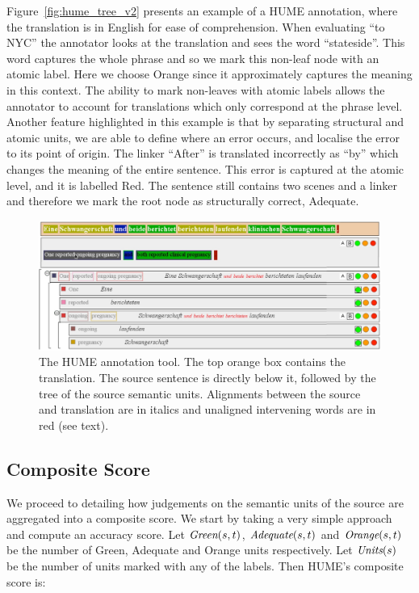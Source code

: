 \documentclass[11pt,letterpaper]{article}
\def\func#1{\text{\it #1}}  %
\def\Adequate{\func{Adequate}}
\def\Green{\func{Green}}
\def\Orange{\func{Orange}}
\def\Units{\func{Units}}
\begin{document}
Figure~\ref{fig:hume_tree_v2} presents an example of a HUME
annotation, where the translation is in English for ease of comprehension.
When evaluating ``to NYC'' the annotator looks at the translation and sees the
word ``stateside''. This word captures the whole phrase and so we mark this
non-leaf node with an atomic label. Here we choose Orange since
it approximately captures the meaning in this context.
The ability to mark non-leaves with atomic labels allows
the annotator to account for translations which only correspond at the phrase
level. Another feature highlighted in this example is that by separating structural
and atomic units, we are able to define where an error occurs, and localise
the error to its point of origin. The linker ``After'' is translated incorrectly as ``by''
which changes the meaning of the entire sentence. This error is captured at
the atomic level, and it is labelled Red. The sentence still contains two scenes and
a linker and therefore we mark the root node as structurally correct, Adequate.

\begin{figure}[t]
    \begin{center}
    \includegraphics[width=1\textwidth]{hume_interface2.jpg}
    \caption{The HUME annotation tool. The top orange box
      contains the translation. The source sentence is directly below it, followed by the tree of the source
      semantic units. Alignments between the source and translation are in italics and
      unaligned intervening words are in red (see text).}
    \label{fig:interface}
    \end{center}
\end{figure}


\subsection{Composite Score}\label{sec:score}

We proceed to detailing how judgements on the semantic units
of the source are aggregated into a composite score. 
We start by taking a very simple approach and compute an accuracy score.
Let $\Green(s,t)$, $\Adequate(s,t)$ and $\Orange(s,t)$ be the number of Green, Adequate and Orange
units respectively. Let $\Units(s)$ be the number of units marked with any of the labels.
Then HUME's composite score is:
\end{document}

